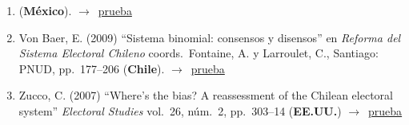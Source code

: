 \documentclass[12 pt, letter]{article}
\newenvironment{CitasMiTrabajo}{
    \begin{footnotesize}
    \begin{enumerate}[label={\footnotesize\emph{cita~\arabic*}},ref=\arabic*] %
        \setlength{\itemsep}{.1\itemsep}
        \setlength{\parskip}{.1\parskip}
    }{\end{enumerate}\end{footnotesize}}
\begin{document}
\begin{CitasMiTrabajo}
        \item {} (\textbf{M\'exico}). $\rightarrow$~\href{http://www.scielo.org.mx/scielo.php?pid=S1665-20372011000200005&script=sci_arttext}{prueba}
        
        \item Von Baer, E. (2009)
        ``Sistema binomial: consensos y disensos'' en
        \emph{Reforma del Sistema Electoral Chileno} coords.\ Fontaine, A. y Larroulet, C., Santiago: PNUD, pp.\ 177--206 (\textbf{Chile}). $\rightarrow$~\href{https://github.com/emagar/cv/blob/master/citasMiTrab/mrs/vonBaer2009.pdf}{prueba}

        \item Zucco, C. (2007)
        ``Where's the bias? A reassessment of the Chilean electoral system'' \emph{Electoral Studies} vol.\ 26, n\'um.\ 2,
        pp.\ 303--14  (\textbf{EE.UU.}) $\rightarrow$~\href{https://github.com/emagar/cv/blob/master/citasMiTrab/mrs/zucco.pdf}{prueba}

        \label{ncites:magar.etal.1998} %


\end{CitasMiTrabajo}
\end{document}
